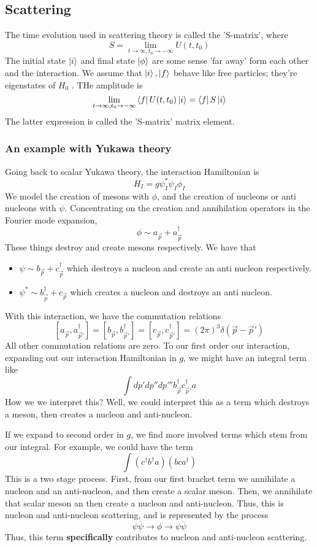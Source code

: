 \subsection{ Scattering } 
The time evolution used in scattering theory is called 
the 'S-matrix', where
\[
S= \lim_{t  \to \infty, t_0 \to  - \infty}U ( t, t_0 )   
\] The initial state $ \ket{i } $ and final state $ \ket{ \phi }  $ 
are some sense 'far away' form each other and the interaction. 
We assume that $ \ket{ i } , \ket{ f  } $ behave like free particles; 
they're eigenstates of $ H_0 $ . 
THe amplitude is 
\[
\lim_{ t  \to \infty, t_0 \to  - \infty } \bra{  f} U ( t, t_0 )\ket { i }  = \bra{ f} S \ket{ i }   
\] The latter expression is called the 'S-matrix' matrix element.

\subsubsection{An example with Yukawa theory} 
Going back to scalar Yukawa theory, the interaction Hamiltonian is
\[
H_ I = g \psi _ I ^ * \psi _ I \phi _ I 
\] We model the creation of mesons with $ \phi $, and the creation of nucleons or anti nucleons with $ \psi $. 
Concentrating on the creation and annihilation operators in the 
Fourier mode expansion,
\[
\phi \sim a_{ \vec{p} } + a_{ \vec{p} }^ \dagger 
\] These things destroy and create mesons respectively. 
We have that 
\begin{itemize}
\item $ \psi \sim b_{ \vec{p} } + c_{ \vec{p} }^\dagger $ which destroys a nucleon and create an anti nucleon respectively. 
\item $ \psi ^ *  \sim b_{ \vec{p} } ^ \dagger + c_{ \vec{p} } $ which creates a nucleon and destroys an anti nucleon. 
\end{itemize}
With this interaction, we have the commutation 
relations 
\[
[ a_{ \vec{p} } , a_{ \vec{p} ' }^\dagger ] = [ b_{ \vec{p} }, b_{ \vec{p} ' }^ \dagger ] = [ c_{\vec{p} } , c_{ \vec{p}' }^\dagger ]  = ( 2 \pi ) ^ 3 \delta ( \vec{p} - \vec{p} ' ) 
\] All other commutation relations are zero. 
To our first order our interaction, expanding out 
our interaction Hamiltonian in $ g$, we might have an 
integral term like 
\[
\int dp' dp'' dp'''  b_{\vec{p}}^\dagger c_{\vec{p} ' }^\dagger a_{ }
\] How we we interpret this? 
Well, we could interpret this as a term which destroys 
a meson, then creates a nucleon and anti-nucleon. 

If we expand to second order in $ g$, 
we find more involved terms which stem from our integral. 
For example, we could have the term 
\[
\int ( c^ \dagger b^\dagger a ) ( b c  a^ \dagger ) 
\] This is a two stage process. 
First, from our first bracket term we annihilate a nucleon and an anti-nucleon, 
and then create a scalar meson. 
Then, we annihilate that scalar meson an then create a nucleon and anti-nucleon. 
Thus, this is nucleon and anti-nucleon scattering, and is 
represented by the process
\[
\psi \overline{\psi } \to \phi \to \psi \overline{\psi }
\] Thus, this term \textbf{specifically } contributes 
to nucleon and anti-nucleon scattering. 


